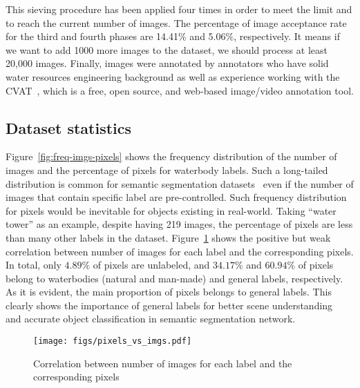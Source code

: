 \documentclass{article}
\begin{document}
This sieving procedure has been applied four times in order to meet the limit and to reach the current number of images. The percentage of image acceptance rate for the third and fourth phases are 14.41$\%$ and 5.06$\%$, respectively. It means if we want to add 1000 more images to the dataset, we should process at least 20,000 images. Finally, images were annotated by annotators who have solid water resources engineering background as well as experience working with the CVAT~\cite{boris_sekachev_2020_4009388}, which is a free, open source, and web-based image/video annotation tool.

\subsection{Dataset statistics} \label{subsec:dataset-statistics}
Figure~\ref{fig:freq-imgs-pixels} shows the frequency distribution of the number of images and the percentage of pixels for waterbody labels. Such a long-tailed distribution is common for semantic segmentation datasets~\cite{lin2014microsoft, zhou2019semantic} even if the number of images that contain specific label are pre-controlled. Such frequency distribution for pixels would be inevitable for objects existing in real-world. Taking ``water tower'' as an example, despite having 219 images, the percentage of pixels are less than many other labels in the dataset. Figure~\ref{fig:freq-vs-pixels} shows the positive but weak correlation between number of images for each label and the corresponding pixels. In total, only $4.89\%$ of pixels are unlabeled, and $34.17\%$ and $60.94\%$ of pixels belong to waterbodies (natural and man-made) and general labels, respectively. As it is evident, the main proportion of pixels belongs to general labels. This clearly shows the importance of general labels for better scene understanding~\cite{caesar2018coco} and accurate object classification in semantic segmentation network.

\begin{figure}[htbp]
    \centering
    \texttt{[image: figs/pixels\_vs\_imgs.pdf]}
    \caption{Correlation between number of images for each label and the corresponding pixels}
    \label{fig:freq-vs-pixels}
\end{figure}
\end{document}
